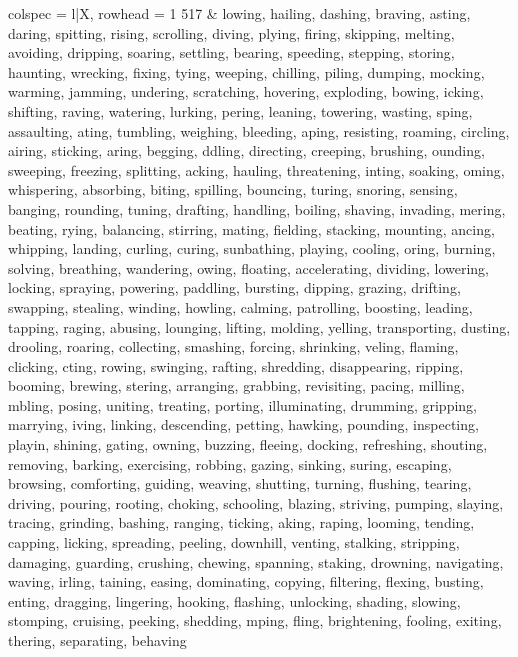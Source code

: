 \begin{tblr}[
  long,
  caption = {Examples from SNLI.},
  entry = {Short Caption},
  label = {tblr:test},
]{
colspec = {l|X},
rowhead = 1}
517 & lowing, hailing, dashing, braving, asting, daring, spitting, rising, scrolling, diving, plying, firing, skipping, melting, avoiding, dripping, soaring, settling, bearing, speeding, stepping, storing, haunting, wrecking, fixing, tying, weeping, chilling, piling, dumping, mocking, warming, jamming, undering, scratching, hovering, exploding, bowing, icking, shifting, raving, watering, lurking, pering, leaning, towering, wasting, sping, assaulting, ating, tumbling, weighing, bleeding, aping, resisting, roaming, circling, airing, sticking, aring, begging, ddling, directing, creeping, brushing, ounding, sweeping, freezing, splitting, acking, hauling, threatening, inting, soaking, oming, whispering, absorbing, biting, spilling, bouncing, turing, snoring, sensing, banging, rounding, tuning, drafting, handling, boiling, shaving, invading, mering, beating, rying, balancing, stirring, mating, fielding, stacking, mounting, ancing, whipping, landing, curling, curing, sunbathing, playing, cooling, oring, burning, solving, breathing, wandering, owing, floating, accelerating, dividing, lowering, locking, spraying, powering, paddling, bursting, dipping, grazing, drifting, swapping, stealing, winding, howling, calming, patrolling, boosting, leading, tapping, raging, abusing, lounging, lifting, molding, yelling, transporting, dusting, drooling, roaring, collecting, smashing, forcing, shrinking, veling, flaming, clicking, cting, rowing, swinging, rafting, shredding, disappearing, ripping, booming, brewing, stering, arranging, grabbing, revisiting, pacing, milling, mbling, posing, uniting, treating, porting, illuminating, drumming, gripping, marrying, iving, linking, descending, petting, hawking, pounding, inspecting, playin, shining, gating, owning, buzzing, fleeing, docking, refreshing, shouting, removing, barking, exercising, robbing, gazing, sinking, suring, escaping, browsing, comforting, guiding, weaving, shutting, turning, flushing, tearing, driving, pouring, rooting, choking, schooling, blazing, striving, pumping, slaying, tracing, grinding, bashing, ranging, ticking, aking, raping, looming, tending, capping, licking, spreading, peeling, downhill, venting, stalking, stripping, damaging, guarding, crushing, chewing, spanning, staking, drowning, navigating, waving, irling, taining, easing, dominating, copying, filtering, flexing, busting, enting, dragging, lingering, hooking, flashing, unlocking, shading, slowing, stomping, cruising, peeking, shedding, mping, fling, brightening, fooling, exiting, thering, separating, behaving \\\midrule

\end{tblr}
